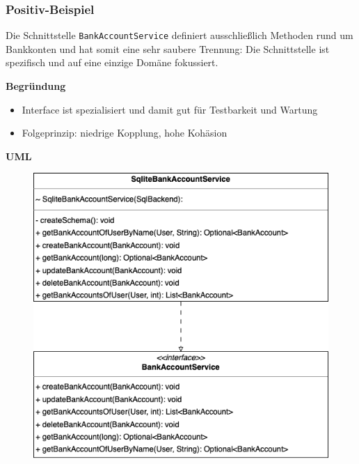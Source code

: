 \subsubsection*{Positiv-Beispiel}
Die Schnittstelle \texttt{BankAccountService} definiert ausschließlich Methoden rund um Bankkonten und hat somit eine sehr saubere Trennung: Die Schnittstelle ist spezifisch und auf eine einzige Domäne fokussiert.

\textbf{Begründung}
\begin{itemize}
    \item Interface ist spezialisiert und damit gut für Testbarkeit und Wartung
    \item Folgeprinzip: niedrige Kopplung, hohe Kohäsion
\end{itemize}
\textbf{UML}
\begin{figure}[htbp]
    \centering
    \includegraphics[width=0.65\linewidth]{kapitel3_solid/ISP_pos_bankaccount.drawio.png}
\end{figure}

